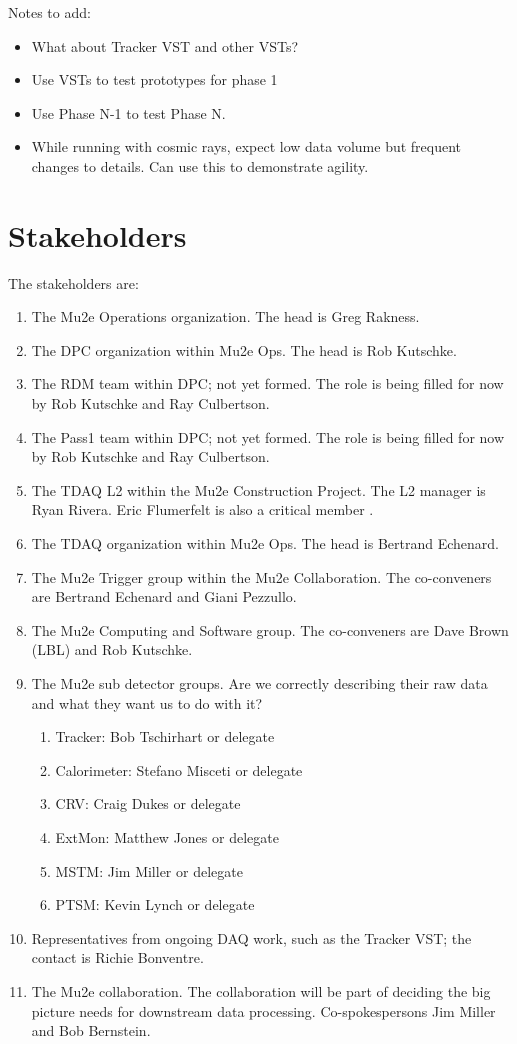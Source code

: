 Notes to add:
\begin{itemize}
  \item What about Tracker VST and other VSTs?
  \item Use VSTs to test prototypes for phase 1
  \item Use Phase N-1 to test Phase N.
  \item While running with cosmic rays, expect low data volume but frequent changes to details.
    Can use this to demonstrate agility.
\end{itemize}


\section{Stakeholders}
\label{sec:stakeholders}

The stakeholders are:
\begin{enumerate}
  \item The Mu2e Operations organization.  The head is Greg Rakness.
  \item The DPC organization within Mu2e Ops.  The head is Rob Kutschke.
  \item The RDM team within DPC; not yet formed.  The role is being filled for now by Rob Kutschke and Ray Culbertson.
  \item The Pass1 team within DPC; not yet formed. The role is being filled for now by Rob Kutschke and Ray Culbertson.
  \item The TDAQ L2 within the Mu2e Construction Project.  The L2 manager is Ryan Rivera.  Eric Flumerfelt is also a critical member .
  \item The TDAQ organization within Mu2e Ops. The head is Bertrand Echenard.
  \item The Mu2e Trigger group within the Mu2e Collaboration.  The co-conveners are Bertrand Echenard and Giani Pezzullo.
  \item The Mu2e Computing and Software group.  The co-conveners are Dave Brown (LBL) and Rob Kutschke.
  \item The Mu2e sub detector groups.  Are we correctly describing their raw data and what they want us to do with it?  
    \begin{enumerate}
      \item Tracker: Bob Tschirhart or delegate
      \item Calorimeter: Stefano Misceti or delegate
      \item CRV:  Craig Dukes or delegate
      \item ExtMon: Matthew Jones or delegate
      \item MSTM: Jim Miller or delegate
      \item PTSM: Kevin Lynch or delegate
    \end{enumerate}
  \item Representatives from ongoing DAQ work, such as the Tracker VST; the contact is Richie Bonventre.
  \item The Mu2e collaboration. The collaboration will be part of deciding the big picture needs for downstream data processing.
    Co-spokespersons Jim Miller and Bob Bernstein.
\end{enumerate}

